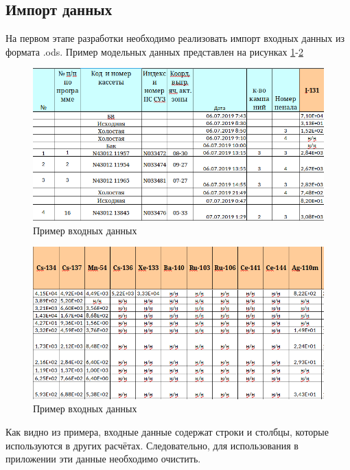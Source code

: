 \subsection{Импорт данных}

На первом этапе разработки необходимо реализовать импорт входных данных из формата .ods. Пример модельных данных представлен на рисунках \ref{fig:ris4}-\ref{fig:ris5} 

\begin{figure}[H]
	\centering
	\includegraphics[width=1\linewidth]{pics/ris4} %
	\caption{Пример входных данных}
	\label{fig:ris4} %
\end{figure}

\begin{figure}[H]
	\centering
	\includegraphics[width=1\linewidth]{pics/ris5} %
	\caption{Пример входных данных}
	\label{fig:ris5} %
\end{figure}

Как видно из примера, входные данные содержат строки и столбцы, которые используются в других расчётах. Следовательно, для использования в приложении эти данные необходимо очистить. 


